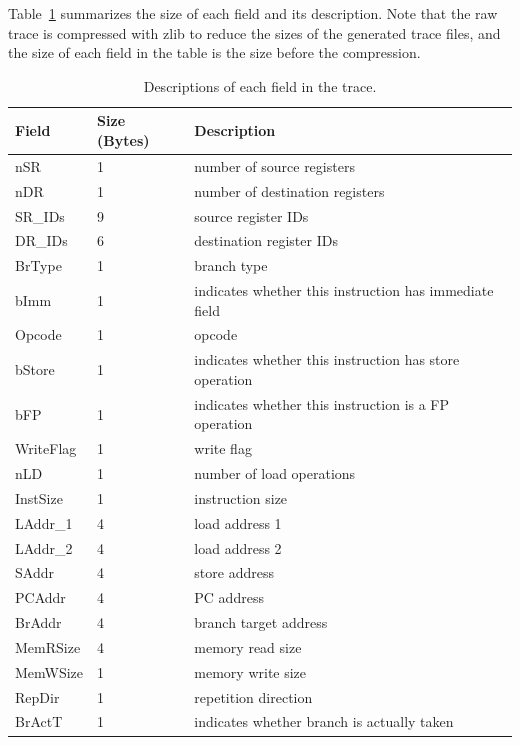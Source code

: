 Table~\ref{table:trace_desc} summarizes the size of each field and its
description.  Note that the raw trace is compressed with zlib to reduce the
sizes of the generated trace files, and the size of each field in the table is
the size before the compression.

\begin{table}[htb]
\begin{footnotesize}
\begin{center}
\caption{Descriptions of each field in the trace.}
\label{table:trace_desc}
\begin{tabular}{|l|l|l|} 
\hline
Field     & Size (Bytes)       & Description \\ \hline \hline
nSR       & 1                  & number of source registers \\ \hline
nDR       & 1                  & number of destination registers \\ \hline
SR\_IDs   & 9                  & source register IDs \\ \hline
DR\_IDs   & 6                  & destination register IDs \\ \hline
BrType    & 1                  & branch type \\ \hline
bImm      & 1                  & indicates whether this instruction has immediate field \\ \hline
Opcode    & 1                  & opcode \\ \hline
bStore    & 1                  & indicates whether this instruction has store operation \\ \hline
bFP       & 1                  & indicates whether this instruction is a FP operation \\ \hline
WriteFlag & 1                  & write flag \\ \hline
nLD       & 1                  & number of load operations \\ \hline
InstSize  & 1                  & instruction size \\ \hline
LAddr\_1  & 4                  & load address 1 \\ \hline
LAddr\_2  & 4                  & load address 2 \\ \hline
SAddr     & 4                  & store address \\ \hline
PCAddr    & 4                  & PC address \\ \hline
BrAddr    & 4                  & branch target address \\ \hline
MemRSize  & 4                  & memory read size \\ \hline
MemWSize  & 1                  & memory write size \\ \hline
RepDir    & 1                  & repetition direction  \\ \hline
BrActT    & 1                  & indicates whether branch is actually taken \\ \hline

\end{tabular}
\end{center}
\end{footnotesize}
\end{table}

